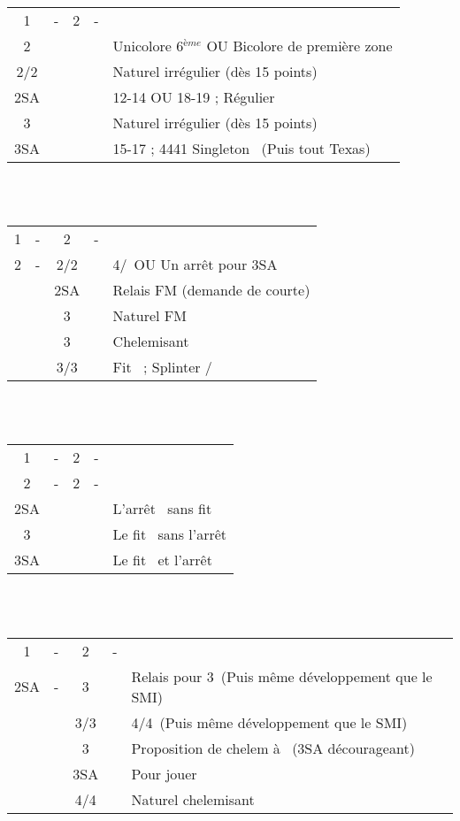 \documentclass[a4paper, oneside, 11pt]{report}
\begin{document}
		\begin{tabular}{cccc|l}
		1\carreau & - & 2\trefle & - &\\
		2\carreau &&&& Unicolore 6$^{ème}$ OU Bicolore de première zone\\
		2\coeur/2\pique &&&& Naturel irrégulier (dès 15 points) \\
		2SA &&&& 12-14 OU 18-19 ; Régulier\\
		3\trefle &&&& Naturel irrégulier (dès 15 points)\\
		3SA &&&& 15-17 ; 4441 Singleton \trefle\ (Puis tout Texas)\\
		\end{tabular}\\\\

		\begin{tabular}{cccc|l}
		1\carreau & - & 2\trefle & - &\\
		2\carreau & - & 2\coeur/2\pique && 4\coeur/\pique\ OU Un arrêt pour 3SA\\
		&& 2SA && Relais FM (demande de courte)\\
		&& 3\trefle && Naturel FM\\
		&& 3\carreau && Chelemisant \carreau\\
		&& 3\coeur/3\pique && Fit \carreau\ ; Splinter \coeur/\pique\\
		\end{tabular}\\\\

		\begin{tabular}{cccc|l}
		1\carreau & - & 2\trefle & - &\\
		2\carreau & - & 2\coeur & - &\\
		2SA &&&& L'arrêt \pique\ sans fit \coeur\\
		3\coeur &&&& Le fit \coeur\ sans l'arrêt \pique\\
		3SA&&&& Le fit \coeur\ et l'arrêt \pique\\
		\end{tabular}\\\\

		\begin{tabular}{cccc|l}
		1\carreau & - & 2\trefle & - &\\
		2SA & - & 3\trefle && Relais pour 3\carreau\ (Puis même développement que le SMI)\\
		&& 3\carreau/3\coeur && 4\coeur/4\pique\ (Puis même développement que le SMI)\\
		&& 3\pique && Proposition de chelem à \trefle\ (3SA décourageant)\\
		&& 3SA && Pour jouer\\
		&& 4\trefle/4\carreau && Naturel chelemisant\\
		\end{tabular}\\\\
\end{document}
